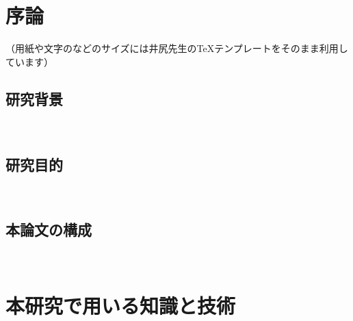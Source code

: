 \documentclass[12pt,a4j]{jreport}
\begin{document}



\chapter{序論}

（用紙や文字のなどのサイズには井尻先生のTeXテンプレートをそのまま利用しています）

\section{研究背景}
~

\section{研究目的}
~

\section{本論文の構成}
~

\chapter{本研究で用いる知識と技術}


\end{document}
